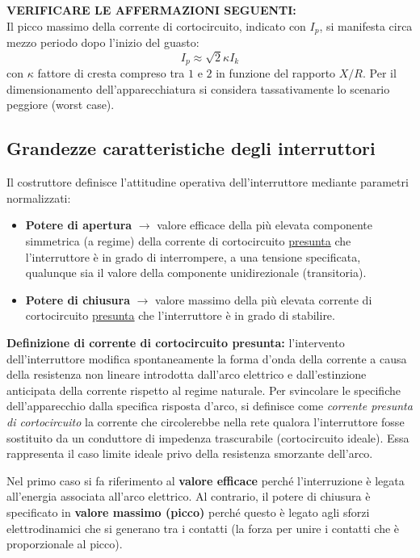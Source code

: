 \textbf{VERIFICARE LE AFFERMAZIONI SEGUENTI:}\\
Il picco massimo della corrente di cortocircuito, indicato con $I_p$, si manifesta circa mezzo periodo dopo l'inizio del guasto:
\[I_p \approx \sqrt{2} \kappa I_k\]
con $\kappa$ fattore di cresta compreso tra $1$ e $2$ in funzione del rapporto $X/R$. Per il dimensionamento dell'apparecchiatura si considera tassativamente lo scenario peggiore (worst case).

\newpage
\subsection{Grandezze caratteristiche degli interruttori}
Il costruttore definisce l'attitudine operativa dell'interruttore mediante parametri normalizzati:
\begin{itemize}
    \item \textbf{Potere di apertura} $\rightarrow$ valore efficace della più elevata componente simmetrica (a regime) della corrente di cortocircuito \underline{presunta} che l'interruttore è in grado di interrompere, a una tensione specificata, qualunque sia il valore della componente unidirezionale (transitoria).
    \item \textbf{Potere di chiusura} $\rightarrow$ valore massimo della più elevata corrente di cortocircuito \underline{presunta} che l'interruttore è in grado di stabilire.
\end{itemize}

\textbf{Definizione di corrente di cortocircuito presunta:}
l'intervento dell'interruttore modifica spontaneamente la forma d'onda della corrente a causa della resistenza non lineare introdotta dall'arco elettrico e dall'estinzione anticipata della corrente rispetto al regime naturale. Per svincolare le specifiche dell'apparecchio dalla specifica risposta d'arco, si definisce come \emph{corrente presunta di cortocircuito} la corrente che circolerebbe nella rete qualora l'interruttore fosse sostituito da un conduttore di impedenza trascurabile (cortocircuito ideale). Essa rappresenta il caso limite ideale privo della resistenza smorzante dell'arco.

Nel primo caso si fa riferimento al \textbf{valore efficace} perché l’interruzione è
legata all’energia associata all’arco elettrico. Al contrario, il potere di chiusura è specificato in \textbf{valore massimo (picco)} perché questo è legato agli sforzi elettrodinamici che si generano tra i contatti (la forza per unire i contatti che è proporzionale al picco).

